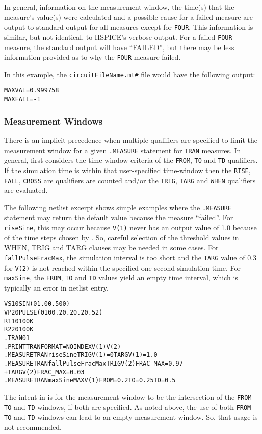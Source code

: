 In general, information on the measurement window, the time(s) that the measure's value(s) were
calculated and a possible cause for a failed measure are output to standard output for all measures except 
for {\tt FOUR}. This information is similar, but not identical, to HSPICE's verbose output.  For
a failed {\tt FOUR} measure, the standard output will have ``FAILED'', but there may be less information
provided as to why the {\tt FOUR} measure failed.

In this example, the \texttt{circuitFileName.mt\#} file would have the following output:
\begin{alltt}
MAXVAL = 0.999758
MAXFAIL = -1
\end{alltt}

\subsubsection{Measurement Windows}
\label{Measure_Measurement_Windows}
There is an implicit precedence when multiple qualifiers are specified to limit the
measurement window for a given {\tt .MEASURE} statement for {\tt TRAN} measures.  In general, 
\Xyce{} first considers the time-window criteria of the {\tt FROM}, {\tt TO} and {\tt TD} qualifiers.
If the simulation time is within that user-specified time-window then the {\tt RISE}, 
{\tt FALL}, {\tt CROSS} are qualifiers are counted and/or the {\tt TRIG}, {\tt TARG} 
and {\tt WHEN} qualifiers are evaluated.

The following netlist excerpt shows simple examples where the {\tt .MEASURE} statement may return
the default value because the measure ``failed''.  For {\tt riseSine}, this may occur 
because {\tt V(1)} never has an output value of
1.0 because of the time steps chosen by \Xyce{}. So, careful selection of the threshold values in
WHEN, TRIG and TARG clauses may be needed in some cases. 
For {\tt fallPulseFracMax}, the simulation interval is too short
and the {\tt TARG} value of 0.3 for {\tt V(2)} is not reached within the specified one-second 
simulation time.  For {\tt maxSine}, the {\tt FROM}, {\tt TO} and {\tt TD} values yield an 
empty time interval, which is typically an error in netlist entry.
\begin{alltt}
VS  1  0  SIN(0 1.0 0.5 0 0)
VP  2  0  PULSE( 0 10 0.2 0.2 0.2 0.5 2)
R1  1  0  100K
R2  2  0  100K
.TRAN 0  1
.PRINT TRAN FORMAT=NOINDEX V(1) V(2) 
.MEASURE TRAN riseSine TRIG V(1)=0 TARG V(1)=1.0
.MEASURE TRAN fallPulseFracMax TRIG V(2) FRAC_MAX=0.97 
+ TARG V(2) FRAC_MAX=0.03
.MEASURE TRAN maxSine MAX V(1) FROM=0.2 TO=0.25 TD=0.5
\end{alltt}
The intent in \Xyce{} is for the measurement window to be the intersection of the 
{\tt FROM-TO} and {\tt TD} windows, if both are specified.  As noted above, 
the use of both {\tt FROM-TO} and {\tt TD} windows can lead to an empty 
measurement window.  So, that usage is not recommended.  

